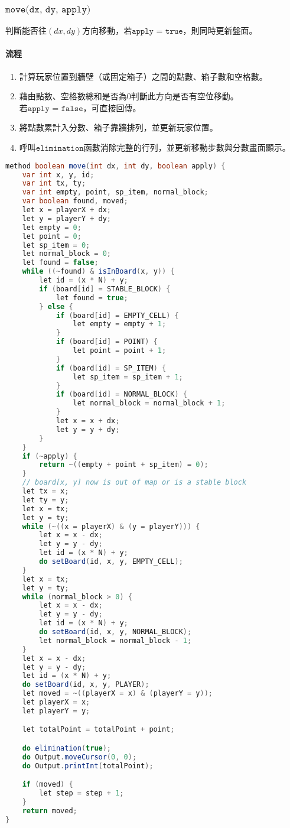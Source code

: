 \documentclass[pstricks, 12pt, a4paper]{article}
\begin{document}
    \subsubsection{$\texttt{move(dx, dy, apply)}$}
      判斷能否往$(dx, dy)$方向移動，若$\texttt{apply = true}$，則同時更新盤面。
      \paragraph{流程}
      \begin{enumerate}
        \item 計算玩家位置到牆壁（或固定箱子）之間的點數、箱子數和空格數。
        \item 藉由點數、空格數總和是否為0判斷此方向是否有空位移動。\\若$\texttt{apply = false}$，可直接回傳。
        \item 將點數累計入分數、箱子靠牆排列，並更新玩家位置。
        \item 呼叫$\texttt{elimination}$函數消除完整的行列，並更新移動步數與分數畫面顯示。
      \end{enumerate}
      \begin{lstlisting}[language=Java, frame=single]
method boolean move(int dx, int dy, boolean apply) {
    var int x, y, id;
    var int tx, ty;
    var int empty, point, sp_item, normal_block;
    var boolean found, moved;
    let x = playerX + dx;
    let y = playerY + dy;
    let empty = 0;
    let point = 0;
    let sp_item = 0;
    let normal_block = 0;
    let found = false;
    while ((~found) & isInBoard(x, y)) {
        let id = (x * N) + y;
        if (board[id] = STABLE_BLOCK) {
            let found = true;
        } else {
            if (board[id] = EMPTY_CELL) {
                let empty = empty + 1;
            }
            if (board[id] = POINT) {
                let point = point + 1;
            }
            if (board[id] = SP_ITEM) {
                let sp_item = sp_item + 1;
            }
            if (board[id] = NORMAL_BLOCK) {
                let normal_block = normal_block + 1;
            }
            let x = x + dx;
            let y = y + dy;
        }
    }
    if (~apply) {
        return ~((empty + point + sp_item) = 0);
    }
    // board[x, y] now is out of map or is a stable block
    let tx = x;
    let ty = y;
    let x = tx;
    let y = ty;
    while (~((x = playerX) & (y = playerY))) {
        let x = x - dx;
        let y = y - dy;
        let id = (x * N) + y;
        do setBoard(id, x, y, EMPTY_CELL);
    }
    let x = tx;
    let y = ty;
    while (normal_block > 0) {
        let x = x - dx;
        let y = y - dy;
        let id = (x * N) + y;
        do setBoard(id, x, y, NORMAL_BLOCK);
        let normal_block = normal_block - 1;
    }
    let x = x - dx;
    let y = y - dy;
    let id = (x * N) + y;
    do setBoard(id, x, y, PLAYER);
    let moved = ~((playerX = x) & (playerY = y));
    let playerX = x;
    let playerY = y;

    let totalPoint = totalPoint + point;

    do elimination(true);
    do Output.moveCursor(0, 0);
    do Output.printInt(totalPoint);

    if (moved) {
        let step = step + 1;
    }
    return moved;
}
      \end{lstlisting}
\end{document}
